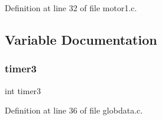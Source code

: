 Definition at line 32 of file motor1.\+c.



\subsection{Variable Documentation}
\mbox{\label{motor1_8c_a0976503fef01ed7144670e9ffde047b4}} 
\subsubsection{timer3}
{\footnotesize\ttfamily int timer3}



Definition at line 36 of file globdata.\+c.

